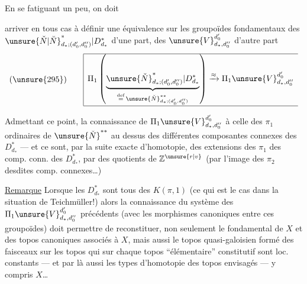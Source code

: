 
En se fatiguant un peu, on doit



arriver en tous cas à définir une équivalence  sur les groupoïdes fondamentaux des $\unsure{\check N|\breve N}^{*}_{d_*;(d'_0,d''_0)}|D_{d_*}^{*}$ d'une part, des $\unsure{V}_{d_*,d''_0}^{d'_0}$ d'autre part
\[
(\unsure{295})\qquad
\begin{array}{|l}
\hline
\displaystyle
\Pi_1\left(\underbrace{\unsure{\check N}^{*}_{d_*;(d'_0,d''_0)}|D_{d_*}^{*}}_{\overset{\mathrm{def}}{=}\,\unsure{\check N}^{**}_{d_*;(d'_0,d''_0)}}\right)
\xrightarrow{\approx}\Pi_1\unsure{V}_{d_*,d''_0}^{d'_0}\\
\hline
\end{array}
\]

Admettant ce point, la connaissance de $\Pi_1\unsure{V}_{d_*,d''_0}^{d'_0}$   à celle des $\pi_1$ ordinaires de $\unsure{\check N}^{**}$  au dessus des différentes composantes connexes des $D_{d_*}^{*}$ --- et ce sont, par la suite exacte d'homotopie, des extensions des $\pi_1$ des comp. conn. des $D_{d_*}^{*}$, par des quotients de $\mathbb Z^{\unsure{r|v}}$ (par l'image des $\pi_2$ desdites comp. connexes\ldots)



\uline{Remarque} Lorsque les $D_{d_*}^{*}$ sont tous des $K(\pi,1)$ (ce qui est le cas dans la situation de Teichmüller!) alors la connaissance du système des $\Pi_1\unsure{V}_{d_*,d''_0}^{d'_0}$ précédents (avec les morphismes canoniques entre ces groupoïdes) doit permettre de reconstituer, non seulement le   fondamental de $X$ et des  topos canoniques associés à $X$, mais aussi le topos quasi-galoisien formé des faisceaux sur les topos qui sur chaque topos ``élémentaire'' constitutif sont loc. constants --- et par là aussi les types d'homotopie des topos envisagés --- y compris $X$\ldots


